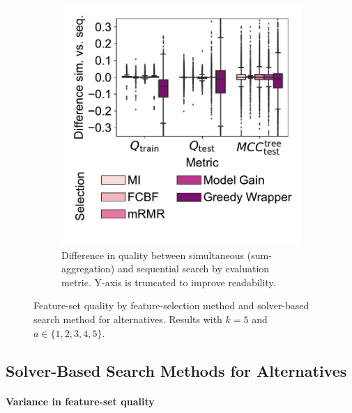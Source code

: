 \documentclass{article}
\theoremstyle{definition}
\begin{document}
\begin{figure}[t]
\begin{subfigure}[t]{0.48\textwidth}
		\includegraphics[width=\textwidth, trim=15 35 5 10, clip]{plots/afs-impact-search-fs-method-metric-diff.pdf}
		\caption{
			Difference in quality between simultaneous (sum-aggregation) and sequential search by evaluation metric.
			Y-axis is truncated to improve readability.
		}
		\label{fig:afs:impact-search-fs-method-metric-diff}
	\end{subfigure}
	\caption{
		Feature-set quality by feature-selection method and solver-based search method for alternatives.
		Results with $k=5$ and $a \in \{1,2,3,4,5\}$.
	}
	\label{fig:afs:impact-search-fs-method-quality}
\end{figure}

\subsection{Solver-Based Search Methods for Alternatives}
\label{sec:afs:evaluation:solver-search-methods}

\paragraph{Variance in feature-set quality}
\end{document}
